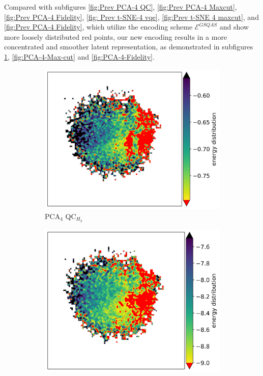 \documentclass{article} %
\begin{document}
Compared with subfigures \ref{fig:Prev PCA-4 QC}, \ref{fig:Prev PCA-4 Maxcut}, \ref{fig:Prev PCA-4 Fidelity}, \ref{fig: Prev t-SNE-4 vqe}, \ref{fig:Prev t-SNE 4 maxcut}, and \ref{fig:Prev PCA-4 Fidelity}, which utilize the encoding scheme $\mathcal{E}^{GSQAS}$ and show more loosely distributed red points, our new encoding results in a more concentrated and smoother latent representation, as demonstrated in subfigures \ref{fig:PCA-4}, \ref{fig:PCA-4-Max-cut} and \ref{fig:PCA-4-Fidelity}.

\begin{figure}[ht]
    \centering
    
    \begin{subfigure}{0.23\textwidth}
        \centering
        \includegraphics[width=\textwidth]{images/vqe-model-circuits_4_qubits_quantum_arch2vec_full_embedding_full_embedding_smooth.png}
        \caption{PCA$_4$ QC$_{H_2}$}
        \label{fig:PCA-4}
    \end{subfigure}
    \begin{subfigure}{0.23\textwidth}
        \centering
        \includegraphics[width=\textwidth]{images/maxcut-model-circuits_4_qubits_quantum_arch2vec_full_embedding_full_embedding_smooth.png}

\end{subfigure}
\end{figure}
\end{document}
